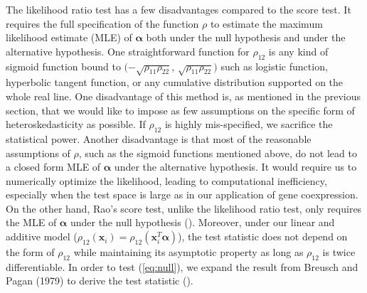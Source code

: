 \documentclass[aap,authoryear, preprint]{imsart}
\numberwithin{equation}{section}
\theoremstyle{plain}
\begin{document}
The likelihood ratio test has a few disadvantages compared to the score test. It requires the full specification of the function $\rho$ to estimate the maximum likelihood estimate (MLE) of $\bm{\alpha}$ both under the null hypothesis and under the alternative hypothesis. One straightforward function for $\rho_{12}$ is any kind of sigmoid function bound to $(-\sqrt{\rho_{11}\rho_{22}}$, $\sqrt{\rho_{11}\rho_{22}})$ such as logistic function, hyperbolic tangent function, or any cumulative distribution supported on the whole real line. One disadvantage of this method is, as mentioned in the previous section, that we would like to impose as few assumptions on the specific form of heteroskedasticity as possible. If $\rho_{12}$ is highly mis-specified, we sacrifice the statistical power. Another disadvantage is that most of the reasonable assumptions of $\rho$, such as the sigmoid functions mentioned above, do not lead to a closed form MLE of $\bm{\alpha}$ under the alternative hypothesis. It would require us to numerically optimize the likelihood, leading to computational inefficiency, especially when the test space is large as in our application of gene coexpression. \\

On the other hand, Rao's score test, unlike the likelihood ratio test, only requires the MLE of $\bm{\alpha}$ under the null hypothesis (\cite{rao1973linear}). Moreover, under our linear and additive model ($\rho_{12}(\bm{x}_i) = \rho_{12}(\bm{x}_i^T\bm{\alpha})$), the test statistic does not depend on the form of $\rho_{12}$ while maintaining its asymptotic property as long as $\rho_{12}$ is twice differentiable. In order to test (\ref{eq:null}), we expand the result from Breusch and Pagan (1979) to derive the test statistic (\cite{breusch1979simple}).\\ 
\end{document}
